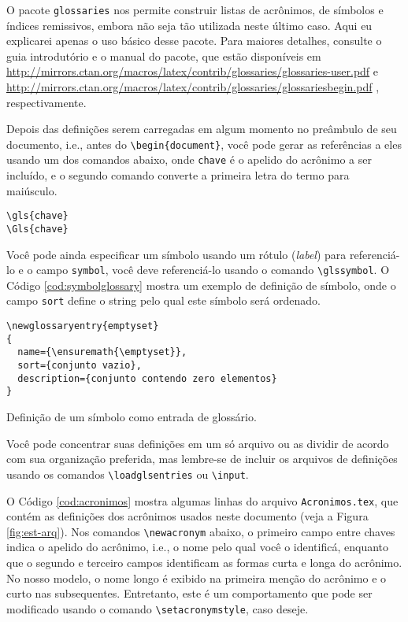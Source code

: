 O pacote \texttt{glossaries} nos permite construir listas de acrônimos, de símbolos e índices remissivos, embora não seja tão utilizada neste último caso. Aqui eu explicarei apenas o uso básico desse pacote. Para maiores detalhes, consulte o guia introdutório e o manual do pacote, que estão disponíveis em \url{http://mirrors.ctan.org/macros/latex/contrib/glossaries/glossaries-user.pdf} \parencite{glossaries-user} e \url{http://mirrors.ctan.org/macros/latex/contrib/glossaries/glossariesbegin.pdf} \parencite{glossaries}, respectivamente.

Depois das definições serem carregadas em algum momento no preâmbulo de seu documento, i.e., antes do \texttt{\textbackslash{}begin\{document\}}, você pode gerar as referências a eles usando um dos comandos abaixo, onde \texttt{chave} é o apelido do acrônimo a ser incluído, e o segundo comando converte a primeira letra do termo para maiúsculo. 

\begin{adjustbox}{fbox, center, tabular=l, vspace=0.5cm}
	\texttt{\textbackslash{}gls\{chave\}} \\
	\texttt{\textbackslash{}Gls\{chave\}}
\end{adjustbox}

Você pode ainda especificar um símbolo usando um rótulo (\textit{label}) para referenciá-lo e o campo \texttt{symbol}, você deve referenciá-lo usando o comando \texttt{\textbackslash{}glssymbol}. O Código \ref{cod:symbolglossary} mostra um exemplo de definição de símbolo, onde o campo \texttt{sort} define o string pelo qual este símbolo será ordenado.

\begin{listing}[ht]
	\begin{verbatim}
\newglossaryentry{emptyset}
{
  name={\ensuremath{\emptyset}},
  sort={conjunto vazio},
  description={conjunto contendo zero elementos}
}
	\end{verbatim}
	\caption{Definição de um símbolo como entrada de glossário.}
	\label{cod:symbolglossary}
\end{listing}

Você pode concentrar suas definições em um só arquivo ou as dividir de acordo com sua organização preferida, mas lembre-se de incluir os arquivos de definições usando os comandos \texttt{\textbackslash{}loadglsentries} ou \texttt{\textbackslash{}input}. 

O Código \ref{cod:acronimos} mostra algumas linhas do arquivo \texttt{Acronimos.tex}, que contém as definições dos acrônimos usados neste documento (veja a Figura \ref{fig:est-arq}). Nos comandos \texttt{\textbackslash{}newacronym} abaixo, o primeiro campo entre chaves indica o apelido do acrônimo, i.e., o nome pelo qual você o identificá, enquanto que o segundo e terceiro campos identificam as formas curta e longa do acrônimo. No nosso modelo, o nome longo é exibido na primeira menção do acrônimo e o curto nas subsequentes. Entretanto, este é um comportamento que pode ser modificado usando o comando \texttt{\textbackslash{}setacronymstyle}, caso deseje. 

